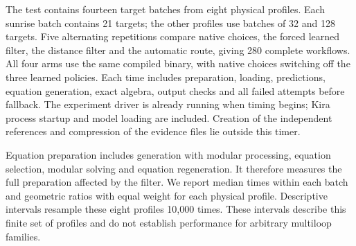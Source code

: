 The test contains fourteen target batches from eight physical profiles.
Each sunrise batch contains 21 targets; the other profiles use batches
of 32 and 128 targets. Five alternating repetitions compare native choices,
the forced learned filter, the distance filter and the automatic route,
giving 280 complete workflows. All four arms use the same compiled
binary, with native choices switching off the three learned policies.
Each time includes preparation, loading,
predictions, equation generation, exact algebra, output checks and all
failed attempts before fallback. The experiment driver is already running when timing begins; Kira process startup and model loading are included. Creation of the independent references
and compression of the evidence files lie outside this timer.

Equation preparation includes generation with modular processing,
equation selection, modular solving and equation regeneration.
It therefore measures the full preparation affected by the filter.
We report median times within each batch and geometric ratios with equal
weight for each physical profile. Descriptive intervals resample these
eight profiles 10,000 times. These intervals describe this finite set of
profiles and do not establish performance for arbitrary multiloop families.
















